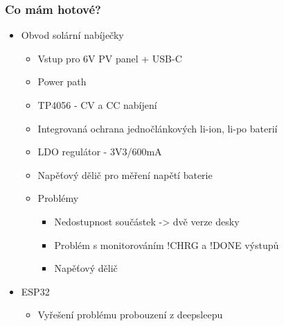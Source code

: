 \documentclass[%
  12pt,       				%
	t,                  %
	aspectratio=1610,   %
	unicode,						%
]{beamer}				    	%
\begin{document}
\begin{frame} 
	\frametitle{Co mám hotové?}
	\begin{itemize}
            \item Obvod solární nabíječky
                \begin{itemize}
					\item Vstup pro 6V PV panel + USB-C
					\item Power path
                    \item TP4056 - CV a CC nabíjení
                    \item Integrovaná ochrana jednočlánkových li-ion, li-po baterií
                    \item LDO regulátor - 3V3/600mA
                    \item Napěťový dělič pro měření napětí baterie
                    \item Problémy
                        \begin{itemize}
                            \item Nedostupnost součástek -> dvě verze desky
				            \item Problém s monitorováním !CHRG a !DONE výstupů
				            \item Napěťový dělič
                        \end{itemize}
				\end{itemize}
			\item ESP32
                \begin{itemize}
                    \item Vyřešení problému probouzení z deepsleepu
                \end{itemize}
	\end{itemize}
\end{frame}
\end{document}
